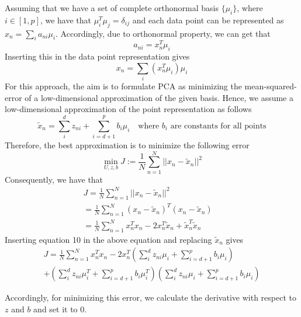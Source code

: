 \documentclass[12pt,a4paper]{article}
\begin{document}
	\noindent Assuming that we have a set of complete orthonormal basis $\{\mu_i\}$, where $i\in[1,p]$, we have that $\mu_i^T\mu_j=\delta_{ij}$ and each data point can be represented as $x_n=\sum_{i}a_{ni}\mu_i$. Accordingly, due to orthonormal property, we can get that
	\begin{equation}
		a_{ni}=x_n^T\mu_i
	\end{equation}
	Inserting this in the data point representation gives
	\begin{equation}
		x_n=\sum_{i}(x_n^T\mu_i)\mu_i
	\end{equation}
	For this approach, the aim is to formulate PCA as minimizing
	the mean-squared-error of a low-dimensional approximation of the given basis. Hence, we assume a low-dimensional approximation of the point representation as follows
	\begin{equation}
		\widetilde{x}_n=\sum_{i}^{d}z_{ni}+\sum_{i=d+1}^{p}b_i\mu_i \quad \text{where $b_i$ are constants for all points}
	\end{equation}
	Therefore, the best approximation is to minimize the following error
	\begin{equation}
		\underset{ U,z,b}{\min}  J:=\frac{1}{N}\sum_{n=1}^{N}||x_n-\widetilde{x}_n||^2
	\end{equation}
	Consequently, we have that
	\begin{align*}
		J = \frac{1}{N}\sum_{n=1}^{N}||x_n-\widetilde{x}_n||^2\qquad \qquad \quad\\= \frac{1}{N}\sum_{n=1}^{N} (x_n-\widetilde{x}_n)^T(x_n-\widetilde{x}_n) \quad \\
		= \frac{1}{N}\sum_{n=1}^{N} x_n^Tx_n-2x_n^T \widetilde{x}_n + \widetilde{x}_n^T\widetilde{x}_n
	\end{align*}
	\noindent Inserting equation 10 in the above equation and replacing $\widetilde{x}_n$ gives
	\begin{align*}
		J = \frac{1}{N}\sum_{n=1}^{N} x_n^Tx_n-2x_n^T (\sum_{i}^{d}z_{ni}\mu_i+\sum_{i=d+1}^{p}b_i\mu_i) \\+ (\sum_{i}^{d}z_{ni}\mu_i^T+ 
		\sum_{i=d+1}^{p}b_i\mu_i^T)(\sum_{i}^{d}z_{ni}\mu_i+\sum_{i=d+1}^{p}b_i\mu_i)
	\end{align*}
	
	\noindent Accordingly, for minimizing this error, we calculate the derivative with respect to $z$ and $b$ and set it to 0.
	
\end{document}
